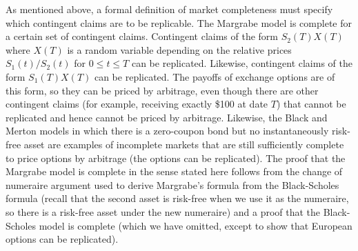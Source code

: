 As mentioned above, a formal definition of market completeness must specify which contingent claims are to be replicable.  The Margrabe model is complete for a certain set of contingent claims.  Contingent claims of the form $S_2(T)X(T)$ where $X(T)$ is a random variable depending on the relative prices $S_1(t)/S_2(t)$ for $0 \leq t\leq T$ can be replicated.  Likewise,  contingent claims of the form $S_1(T)X(T)$ can be replicated.  The payoffs of exchange options are of this form, so they can be priced by arbitrage, even though there are other contingent claims (for example, receiving exactly \$100 at date $T$) that cannot be replicated and hence cannot be priced by arbitrage.  Likewise, the Black and Merton models in which there is a zero-coupon bond but no instantaneously risk-free asset are examples of incomplete markets that are still sufficiently complete to price options by arbitrage (the options can be replicated).  The proof that the Margrabe model is complete in the sense stated here follows from the change of numeraire argument used to derive Margrabe's formula from the Black-Scholes formula (recall that the second asset is risk-free when we use it as the numeraire, so there is a risk-free asset under the new numeraire) and a proof that the Black-Scholes model is complete (which we have omitted, except to show that European options can be replicated).

